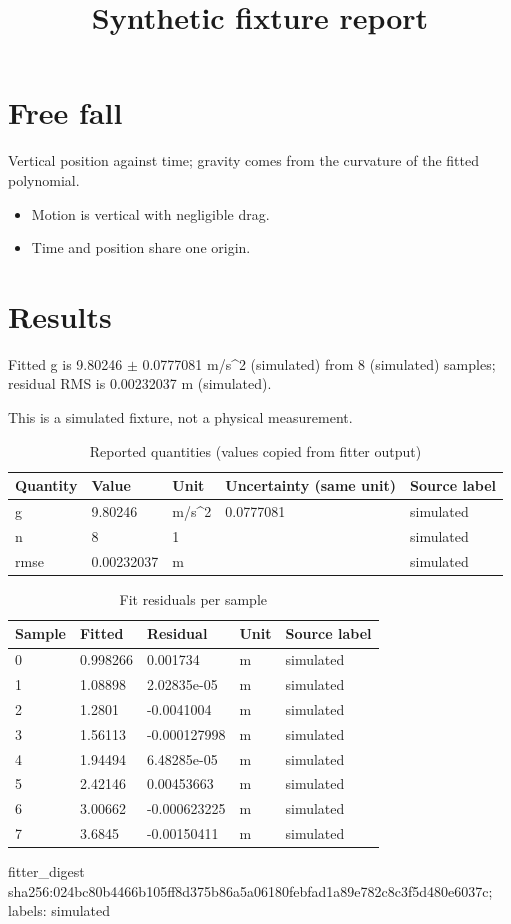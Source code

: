 \documentclass[11pt]{article}
\title{Synthetic fixture report}
\author{}\date{}
\begin{document}
\maketitle
\section*{Free fall}
Vertical position against time; gravity comes from the curvature of the fitted polynomial.

\begin{itemize}
\item Motion is vertical with negligible drag.
\item Time and position share one origin.
\end{itemize}
\section*{Results}
Fitted g is 9.80246 $\pm$ 0.0777081 m/s\textasciicircum{}2 (simulated) from 8 (simulated) samples; residual RMS is 0.00232037 m (simulated).

This is a simulated fixture, not a physical measurement.
\begin{longtable}{lllll}
\caption{Reported quantities (values copied from fitter output)}\\ \hline
Quantity & Value & Unit & Uncertainty (same unit) & Source label \\ \hline \endhead
g & 9.80246 & m/s\textasciicircum{}2 & 0.0777081 & simulated \\
n & 8 & 1 &  & simulated \\
rmse & 0.00232037 & m &  & simulated \\
\hline\end{longtable}
\begin{longtable}{lllll}
\caption{Fit residuals per sample}\\ \hline
Sample & Fitted & Residual & Unit & Source label \\ \hline \endhead
0 & 0.998266 & 0.001734 & m & simulated \\
1 & 1.08898 & 2.02835e-05 & m & simulated \\
2 & 1.2801 & -0.0041004 & m & simulated \\
3 & 1.56113 & -0.000127998 & m & simulated \\
4 & 1.94494 & 6.48285e-05 & m & simulated \\
5 & 2.42146 & 0.00453663 & m & simulated \\
6 & 3.00662 & -0.000623225 & m & simulated \\
7 & 3.6845 & -0.00150411 & m & simulated \\
\hline\end{longtable}
\noindent fitter\_digest sha256:024bc80b4466b105ff8d375b86a5a06180febfad1a89e782c8c3f5d480e6037c; labels: simulated
\end{document}

